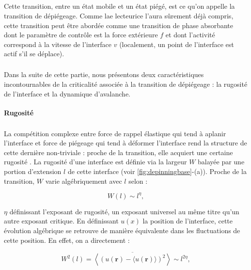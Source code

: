 \subparagraph{}Cette transition, entre un état mobile et un état piégé, est ce qu'on appelle la transition de dépiégeage. Comme lae lecteurice l'aura sûrement déjà compris, cette transition peut être abordée comme une transition de phase absorbante dont le paramètre de contrôle est la force extérieure $f$ et dont l'activité correspond à la vitesse de l'interface $v$ (localement, un point de l'interface est actif s'il se déplace). 


\subparagraph{}Dans la suite de cette partie, nous présentons deux caractéristiques incontournables de la criticalité associée à la transition de dépiégeage : la rugosité de l'interface et la dynamique d'avalanche.

\paragraph{Rugosité}

\subparagraph{}La compétition complexe entre force de rappel élastique qui tend à aplanir l'interface et force de piégeage qui tend à déformer l'interface rend la structure de cette dernière non-triviale : proche de la transition, elle acquiert une certaine rugosité \cite{fisher_collective_1998, wiese_theory_2022}. La rugosité d'une interface est définie via la largeur $W$ balayée par une portion d'extension $l$ de cette interface (voir \autoref{fig:depinningbase}-(a)). Proche de la transition, $W$ varie algébriquement avec $l$ selon :

\begin{equation}
	W(l) \sim l^\eta,
\end{equation}

\noindent $\eta$ définissant l'exposant de rugosité, un exposant universel au même titre qu'un autre exposant critique. En définissant $u(x)$ la position de l'interface, cette évolution algébrique se retrouve de manière équivalente dans les fluctuations de cette position. En effet, on a directement :

\begin{equation}
	W^2(l) = \overline{\left\langle (u(\mathbf{r}) - \langle u(\mathbf{r}) \rangle)^2\right\rangle} \sim l^{2\eta},
\end{equation}

